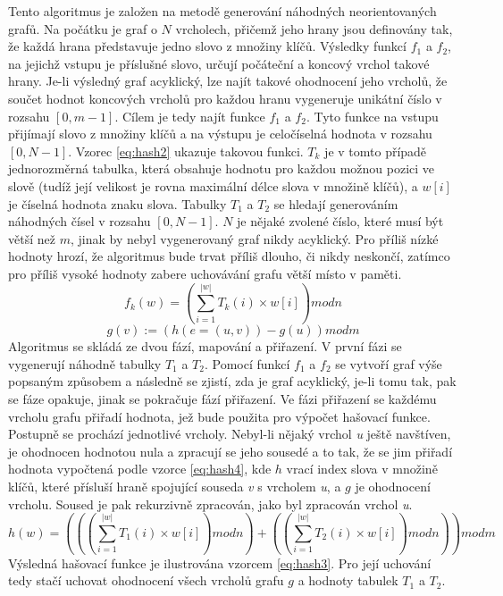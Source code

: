 \documentclass[11pt,twoside,a4paper]{book}
\begin{document}
Tento algoritmus je založen na metodě generování náhodných neorientovaných grafů. Na počátku je graf o $N$ vrcholech, přičemž jeho hrany jsou definovány tak, že každá hrana představuje jedno slovo z množiny klíčů. Výsledky funkcí $f_1$ a $f_2$, na jejichž vstupu je příslušné slovo, určují počáteční a koncový vrchol takové hrany. Je-li výsledný graf acyklický, lze najít takové ohodnocení jeho vrcholů, že součet hodnot koncových vrcholů pro každou hranu vygeneruje unikátní číslo v rozsahu $[0,m-1]$. Cílem je tedy najít funkce $f_1$ a $f_2$. Tyto funkce na vstupu přijímají slovo z množiny klíčů a na výstupu je celočíselná hodnota v rozsahu $[0,N-1]$. Vzorec \ref{eq:hash2} ukazuje takovou funkci. $T_k$ je v tomto případě jednorozměrná tabulka, která obsahuje hodnotu pro každou možnou pozici ve slově (tudíž její velikost je rovna maximální délce slova v množině klíčů), a $w[i]$ je číselná hodnota znaku slova. Tabulky $T_1$ a $T_2$ se hledají generováním náhodných čísel v rozsahu $[0,N-1]$. $N$ je nějaké zvolené číslo, které musí být větší než $m$, jinak by nebyl vygenerovaný graf nikdy acyklický. Pro příliš nízké hodnoty hrozí, že algoritmus bude trvat příliš dlouho, či nikdy neskončí, zatímco pro příliš vysoké hodnoty zabere uchovávání grafu větší místo v paměti.
\begin{equation} \label{eq:hash2}
f_k(w)=(\sum\limits_{i=1}^{|w|} T_k(i) \times w[i]) mod n
\end{equation}
\begin{equation} \label{eq:hash4}
g(v) := (h(e=(u,v))-g(u)) mod m
\end{equation}
Algoritmus se skládá ze dvou fází, mapování a přiřazení. V první fázi se vygenerují náhodně tabulky $T_1$ a $T_2$. Pomocí funkcí $f_1$ a $f_2$ se vytvoří graf výše popsaným způsobem a následně se zjistí, zda je graf acyklický, je-li tomu tak, pak se fáze opakuje, jinak se pokračuje fází přiřazení. 
 Ve fázi přiřazení se každému vrcholu grafu přiřadí hodnota, jež bude použita pro výpočet hašovací funkce. Postupně se prochází jednotlivé vrcholy. Nebyl-li nějaký vrchol \textit{u} ještě navštíven, je ohodnocen hodnotou nula a zpracují se jeho sousedé a to tak, že se jim přiřadí hodnota vypočtená podle vzorce \ref{eq:hash4}, kde $h$ vrací index slova v množině klíčů, které přísluší hraně spojující souseda \textit{v} s vrcholem \textit{u}, a $g$ je ohodnocení vrcholu. Soused je pak rekurzivně zpracován, jako byl zpracován vrchol \textit{u}.
\begin{equation} \label{eq:hash3}
h(w) = (((\sum\limits_{i=1}^{|w|} T_1(i) \times w[i]) mod n) + ((\sum\limits_{i=1}^{|w|} T_2(i) \times w[i]) mod n)) mod m
\end{equation}
Výsledná hašovací funkce je ilustrována vzorcem \ref{eq:hash3}.  Pro její uchování tedy stačí uchovat ohodnocení všech vrcholů grafu $g$ a hodnoty tabulek $T_1$ a $T_2$.
\end{document}
